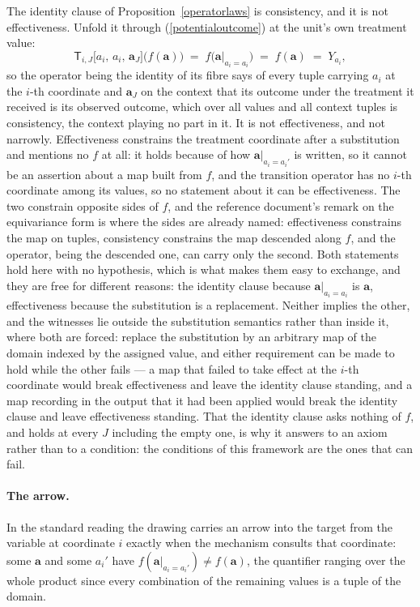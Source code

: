 \documentclass{article}
\theoremstyle{definition}
\theoremstyle{remark}
\begin{document}
The identity clause of Proposition~\ref{operatorlaws} is consistency, and it is not effectiveness. Unfold it through (\ref{potentialoutcome}) at the unit's own treatment value:
\[
\mathsf{T}_{i,J}\bigl[a_i,\, a_i,\, \boldsymbol{a}_J\bigr]\bigl(f(\boldsymbol{a})\bigr)
\;=\; f\bigl(\boldsymbol{a}|_{a_i = a_i}\bigr)
\;=\; f(\boldsymbol{a})
\;=\; Y_{a_i},
\]
so the operator being the identity of its fibre says of every tuple carrying $a_i$ at the $i$-th coordinate and $\boldsymbol{a}_J$ on the context that its outcome under the treatment it received is its observed outcome, which over all values and all context tuples is consistency, the context playing no part in it. It is not effectiveness, and not narrowly. Effectiveness constrains the treatment coordinate after a substitution and mentions no $f$ at all: it holds because of how $\boldsymbol{a}|_{a_i = a_i'}$ is written, so it cannot be an assertion about a map built from $f$, and the transition operator has no $i$-th coordinate among its values, so no statement about it can be effectiveness. The two constrain opposite sides of $f$, and the reference document's remark on the equivariance form is where the sides are already named: effectiveness constrains the map on tuples, consistency constrains the map descended along $f$, and the operator, being the descended one, can carry only the second. Both statements hold here with no hypothesis, which is what makes them easy to exchange, and they are free for different reasons: the identity clause because $\boldsymbol{a}|_{a_i = a_i}$ is $\boldsymbol{a}$, effectiveness because the substitution is a replacement. Neither implies the other, and the witnesses lie outside the substitution semantics rather than inside it, where both are forced: replace the substitution by an arbitrary map of the domain indexed by the assigned value, and either requirement can be made to hold while the other fails --- a map that failed to take effect at the $i$-th coordinate would break effectiveness and leave the identity clause standing, and a map recording in the output that it had been applied would break the identity clause and leave effectiveness standing. That the identity clause asks nothing of $f$, and holds at every $J$ including the empty one, is why it answers to an axiom rather than to a condition: the conditions of this framework are the ones that can fail.

\paragraph{The arrow.} In the standard reading the drawing carries an arrow into the target from the variable at coordinate $i$ exactly when the mechanism consults that coordinate: some $\boldsymbol{a}$ and some $a_i'$ have $f(\boldsymbol{a}|_{a_i = a_i'}) \neq f(\boldsymbol{a})$, the quantifier ranging over the whole product since every combination of the remaining values is a tuple of the domain.
\end{document}
